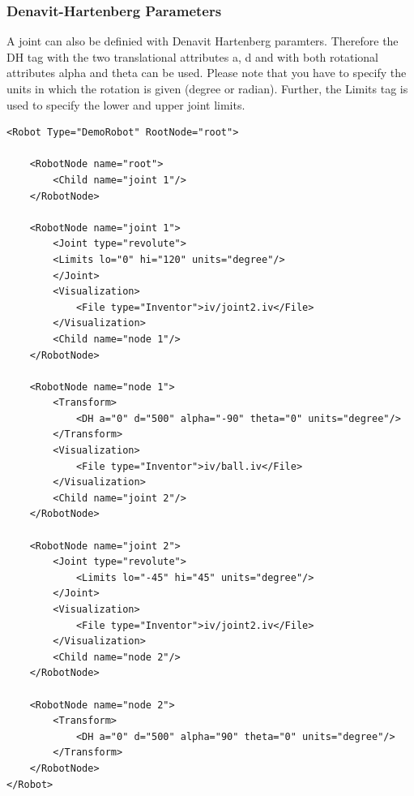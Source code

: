 \subsubsection{Denavit-Hartenberg Parameters}
\par
A joint can also be definied with Denavit Hartenberg paramters. Therefore the DH tag with the two translational attributes a, d and with both rotational attributes alpha and theta can be used. Please note that you have to specify the units in which the rotation is given (degree or radian). Further, the Limits tag is used to specify the lower and upper joint limits. 
\begin{lstlisting}
<Robot Type="DemoRobot" RootNode="root">

    <RobotNode name="root">
        <Child name="joint 1"/>
    </RobotNode>

    <RobotNode name="joint 1">
        <Joint type="revolute">
        <Limits lo="0" hi="120" units="degree"/>
        </Joint>
        <Visualization>
            <File type="Inventor">iv/joint2.iv</File>
        </Visualization>
        <Child name="node 1"/>
    </RobotNode>

    <RobotNode name="node 1">
        <Transform>
            <DH a="0" d="500" alpha="-90" theta="0" units="degree"/>
        </Transform>
        <Visualization>
            <File type="Inventor">iv/ball.iv</File>
        </Visualization>
        <Child name="joint 2"/>
    </RobotNode>

    <RobotNode name="joint 2">
        <Joint type="revolute">
            <Limits lo="-45" hi="45" units="degree"/>
        </Joint>
        <Visualization>
            <File type="Inventor">iv/joint2.iv</File>
        </Visualization>
        <Child name="node 2"/>
    </RobotNode>

    <RobotNode name="node 2">
        <Transform>
            <DH a="0" d="500" alpha="90" theta="0" units="degree"/>
        </Transform>
    </RobotNode>
</Robot>
\end{lstlisting}
\par
